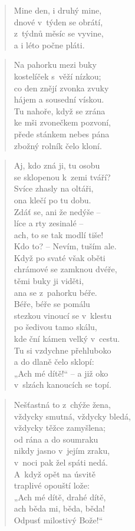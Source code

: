 \begin{verse}
Mine den, i druhý mine, \\
dnové v~týden se obrátí, \\
z~týdnů měsíc se vyvine, \\
a i léto počne pláti.
\end{verse}

\begin{verse}
Na pahorku mezi buky \\
kostelíček s~věží nízkou; \\
co den znějí zvonka zvuky \\
hájem a sousední vískou. \\
Tu nahoře, když se zrána \\
ke mši zvonečkem pozvoní, \\
přede stánkem nebes pána \\
zbožný rolník čelo kloní.
\end{verse}

\begin{verse}
Aj, kdo zná ji, tu osobu \\
se sklopenou k~zemi tváří? \\
Svíce zhasly na oltáři, \\
ona klečí po tu dobu. \\
Zdáť se, ani že nedýše -- \\
líce a rty zesinalé -- \\
ach, to se tak modlí tiše! \\
Kdo to? -- Nevím, tuším ale. \\
Když po svaté však oběti \\
chrámové se zamknou dvéře, \\
těmi buky ji viděti, \\
ana se z~pahorku béře. \\
Béře, béře se pomálu \\
stezkou vinoucí se v~klestu \\
po šedivou tamo skálu, \\
kde ční kámen velký v~cestu. \\
Tu si vzdychne přehluboko \\
a do dlaně čelo sklopí: \\
„Ach mé dítě!“ -- a již oko \\
v~slzách kanoucích se topí.
\end{verse}

\begin{verse}
Nešťastná to z~chýže žena, \\
vždycky smutná, vždycky bledá, \\
vždycky těžce zamyšlena; \\
od rána a do soumraku \\
nikdy jasno v~jejím zraku, \\
v~noci pak žel spáti nedá. \\
A~když opět na úsvitě \\
traplivé opouští lože: \\
„Ach mé dítě, drahé dítě, \\
ach běda mi, běda, běda! \\
Odpusť milostivý Bože!“
\end{verse}

